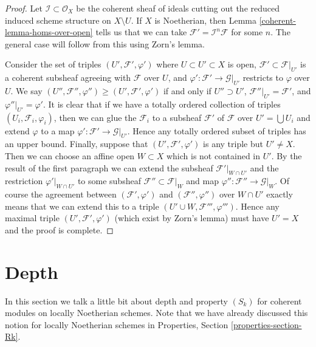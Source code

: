 \begin{proof}

Let $\mathcal{I} \subset \mathcal{O}_X$ be the coherent sheaf of ideals
cutting out the reduced induced scheme structure on $X \setminus U$.
If $X$ is Noetherian, then Lemma \ref{coherent-lemma-homs-over-open} tells us that
we can take $\mathcal{F}' = \mathcal{I}^n\mathcal{F}$
for some $n$. The general case will follow from this using Zorn's lemma.

\medskip\noindent
Consider the set of triples $(U', \mathcal{F}', \varphi')$ where
$U \subset U' \subset X$ is open, $\mathcal{F}' \subset \mathcal{F}|_{U'}$
is a coherent subsheaf agreeing with $\mathcal{F}$ over $U$, and
$\varphi' : \mathcal{F}' \to \mathcal{G}|_{U'}$ restricts to
$\varphi$ over $U$. We say
$(U'', \mathcal{F}'', \varphi'') \geq (U', \mathcal{F}', \varphi')$
if and only if $U'' \supset U'$, $\mathcal{F}''|_{U'} = \mathcal{F}'$,
and $\varphi''|_{U'} = \varphi'$.
It is clear that if we have a totally ordered collection
of triples $(U_i, \mathcal{F}_i, \varphi_i)$, then we
can glue the $\mathcal{F}_i$ to a subsheaf $\mathcal{F}'$ of $\mathcal{F}$
over $U' = \bigcup U_i$ and extend $\varphi$ to a map
$\varphi' : \mathcal{F}' \to \mathcal{G}|_{U'}$.
Hence any totally ordered subset of triples has an upper bound.
Finally, suppose that $(U', \mathcal{F}', \varphi')$
is any triple but $U' \not = X$. Then we can choose an
affine open $W \subset X$ which is not contained in $U'$.
By the result of the first paragraph we can extend
the subsheaf $\mathcal{F}'|_{W \cap U'}$ and the restriction
$\varphi'|_{W \cap U'}$ to some subsheaf $\mathcal{F}'' \subset \mathcal{F}|_W$
and map $\varphi'' : \mathcal{F}'' \to \mathcal{G}|_W$.
Of course the agreement between $(\mathcal{F}', \varphi')$ and
$(\mathcal{F}'', \varphi'')$ over $W \cap U'$ exactly means that
we can extend this to a triple $(U' \cup W, \mathcal{F}''', \varphi''')$.
Hence any maximal triple $(U', \mathcal{F}', \varphi')$
(which exist by Zorn's lemma) must have $U' = X$ and the
proof is complete.
\end{proof}

\section{Depth}
\label{coherent-section-depth}
In this section we talk a little bit about depth and property
$(S_k)$ for coherent modules on locally Noetherian schemes.
Note that we have already discussed this notion for locally
Noetherian schemes in Properties, Section \ref{properties-section-Rk}.

